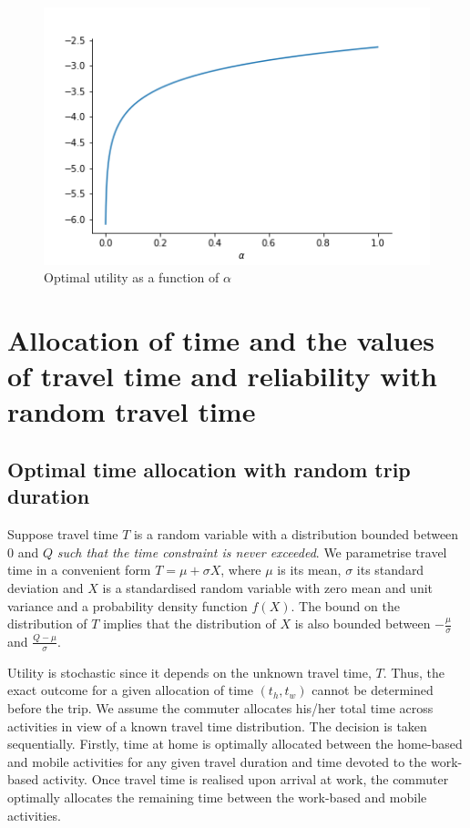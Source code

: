 \documentclass[12pt,a4paper,british]{article}
\theoremstyle{definition}
\theoremstyle{plain}
\theoremstyle{plain}
\begin{document}
\begin{figure}
\begin{centering}
\includegraphics{uStarAlpha}
\par\end{centering}
\centering{}\caption{Optimal utility as a function of $\alpha$}
\end{figure}


\section{Allocation of time and the values of travel time and reliability
with random travel time }

\subsection{Optimal time allocation with random trip duration}

Suppose travel time $T$ is a random variable with a distribution
bounded between $0$ and $Q$ \textit{such that the time constraint
is never exceeded}. We parametrise travel time in a convenient form
$T=\mu+\sigma X$, where $\mu$ is its mean, $\sigma$ its standard
deviation and $X$ is a standardised random variable with zero mean
and unit variance and a probability density function $f\left(X\right)$.
The bound on the distribution of $T$ implies that the distribution
of $X$ is also bounded between $-\frac{\mu}{\sigma}$ and $\frac{Q-\mu}{\sigma}$. 

Utility is stochastic since it depends on the unknown travel time,
$T$. Thus, the exact outcome for a given allocation of time $\left(t_{h},t_{w}\right)$
cannot be determined before the trip. We assume the commuter allocates
his/her total time across activities in view of a known travel time
distribution. The decision is taken sequentially. Firstly, time at
home is optimally allocated between the home-based and mobile activities
for any given travel duration and time devoted to the work-based activity.
Once travel time is realised upon arrival at work, the commuter optimally
allocates the remaining time between the work-based and mobile activities.
\end{document}
